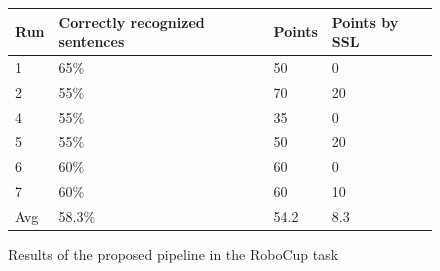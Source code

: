 \begin{figure}[ht]
	\begin{tabular}{ | l | l | l | l |}
		\hline
		Run & Correctly recognized sentences & Points & Points by SSL \\ \hline
		1 & 65\% & 50 &  0 \\ \hline
		2 & 55\% & 70 & 20 \\ \hline
		4 & 55\% & 35 &  0 \\ \hline
		5 & 55\% & 50 & 20 \\ \hline
		6 & 60\% & 60 &  0 \\ \hline
		7 & 60\% & 60 & 10 \\ \hhline{|=|=|=|=|} 
		Avg & 58.3\% & 54.2 & 8.3\\
		\hline
	\end{tabular}
	\caption{Results of the proposed pipeline in the RoboCup task}
	\label{pic:eval_task_results_new}
\end{figure}